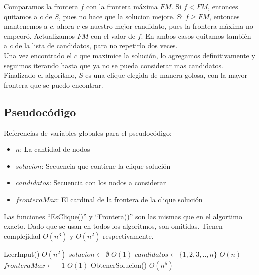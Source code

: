 Comparamos la frontera $f$ con la frontera máxima $FM$. Si $f < FM$, entonces quitamos a $c$ de $S$, pues no hace que la solucion mejore. Si $f \geq FM$, entonces mantenemos a $c$, ahora $c$ es nuestro mejor candidato, pues la frontera máxima no empeoró. Actualizamos $FM$ con el valor de $f$. En ambos casos quitamos también a $c$ de la lista de candidatos, para no repetirlo dos veces. \\

Una vez encontrado el $c$ que maximice la solución, lo agregamos definitivamente y seguimos iterando hasta que ya no se pueda considerar mas candidatos. \\

Finalizado el algoritmo, $S$ es una clique elegida de manera golosa, con la mayor frontera que se puedo encontrar. \\


\subsection{Pseudocódigo}

Referencias de variables globales para el pseudocódigo:
\begin{itemize}
    \item $n$: La cantidad de nodos
    \item $solucion$: Secuencia que contiene la clique solución
    \item $candidatos$: Secuencia con los nodos a considerar
    \item $fronteraMax$: El cardinal de la frontera de la clique solución
\end{itemize}

Las funciones ``EsClique()'' y ``Frontera()'' son las mismas que en el algortimo exacto. Dado que se usan en todos los algoritmos, son omitidas. Tienen complejidad $O(n^3)$ y $O(n^2)$ respectivamente.

\begin{algorithm}[H]
\begin{algorithmic}
    \State LeerInput()                              \Comment $O(n^2)$
    \State $solucion \gets \emptyset$               \Comment $O(1)$
    \State $candidatos \gets \{1, 2, 3, .. , n\} $  \Comment $O(n)$
    \State $fronteraMax \gets -1$                   \Comment $O(1)$
    \State ObtenerSolucion()                        \Comment $O(n^5)$
\EndFunction
\end{algorithmic}
\end{algorithm}



